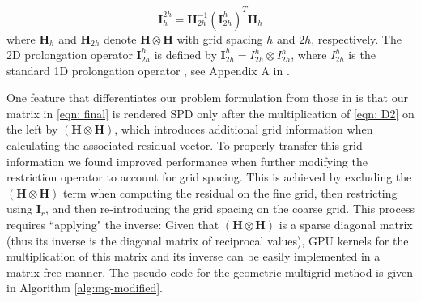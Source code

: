 \begin{equation}
    \boldsymbol{I}_{h}^{2h} = \boldsymbol{H}_{2h}^{-1} \left(\boldsymbol{I}_{2h}^h\right)^T\boldsymbol{H}_h
\end{equation}
%
where $\boldsymbol{H}_{h}$ and $\boldsymbol{H}_{2h}$ denote $\boldsymbol{H} \otimes \boldsymbol{H}$ with grid spacing $h$ and $2h$, respectively. The 2D prolongation operator $\boldsymbol{I}_{2h}^h$ is defined by $\boldsymbol{I}_{2h}^h = I_{2h}^h \otimes I_{2h}^h$, where $I_{2h}^h$ is the standard 1D prolongation operator \citep{Briggs2000}, see Appendix A in \citep{Ruggiu2018}.

One feature that differentiates our problem formulation from those in \citep{Ruggiu2018} is that our matrix in \eqref{eqn: final} is rendered SPD only after the multiplication of \eqref{eqn: D2} on the left by $\left(\boldsymbol{H} \otimes \boldsymbol{H} \right)$, which introduces additional grid information when calculating the associated residual vector. To properly transfer this grid information we found improved performance when further modifying the restriction operator to account for grid spacing. This is achieved by excluding the $\left(\boldsymbol{H} \otimes \boldsymbol{H} \right)$ term when computing the residual on the fine grid, then restricting using $\boldsymbol{I}_r$, and then re-introducing the grid spacing on the coarse grid. This process requires ``applying" the inverse: Given that $\left(\boldsymbol{H} \otimes \boldsymbol{H} \right)$ is a sparse diagonal matrix (thus its inverse is the diagonal matrix of reciprocal values), GPU kernels for the multiplication of this matrix and its inverse can be easily implemented in a matrix-free manner. The pseudo-code for the geometric multigrid method is given in Algorithm \autoref{alg:mg-modified}.





